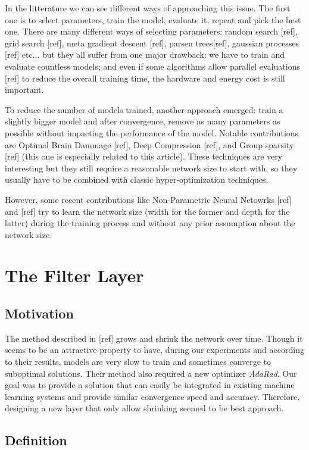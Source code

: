 \documentclass[sigconf]{acmart}
\begin{document}
\par In the litterature we can see different ways of approaching this issue. The first one is to select parameters, train the model, evaluate it, repeat and pick the best one. There are many different ways of selecting parameters: random search [ref], grid search [ref], meta gradient descent [ref], parsen trees[ref], gaussian processes [ref] etc... but they all suffer from one major drawback: we have to train and evaluate countless models; and even if some algorithms allow parallel evaluations [ref] to reduce the overall training time, the hardware and energy cost is still important.
\par To reduce the number of models trained, another approach emerged: train a slightly bigger model and after convergence, remove as many parameters as possible without impacting the performance of the model. Notable contributions are Optimal Brain Dammage [ref], Deep Compression [ref], and Group sparsity [ref] (this one is especially related to this article). These techniques are very interesting but they still require a reasonable network size to start with, so they usually have to be combined with classic hyper-optimization techniques.
\par However, some recent contributions like Non-Parametric Neural Netowrks [ref] and [ref] try to learn the network size (width for the former and depth for the latter) during the training process and without any prior assumption about the network size.

\section{The Filter Layer}
\subsection{Motivation}

The method described in [ref] grows and shrink the network over time. Though it seems to be an attractive property to have, during our experiments and according to their results, models are very slow to train and sometimes converge to suboptimal solutions. Their method also required a new optimizer \textit{AdaRad}. Our goal was to provide a solution that can easily be integrated in existing machine learning systems and provide similar convergence speed and accuracy. Therefore, designing a new layer that only allow shrinking seemed to be best approach.

\subsection{Definition}
\end{document}
